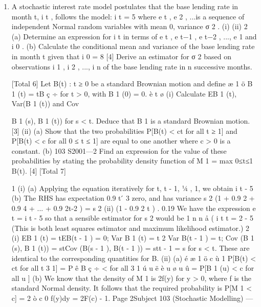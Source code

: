 \documentclass[a4paper,12pt]{article}
\begin{document}
\begin{enumerate}
\item A stochastic interest rate model postulates that the base lending rate in month t,
i t , follows the model:
i t = 5%
where e t , e 2 , ...is a sequence of independent Normal random variables with mean
0, variance σ 2 .
(i)
(ii)
2
(a) Determine an expression for i t in terms of e t , e t−1 , e t−2 , ..., e 1 and i 0 .
(b) Calculate the conditional mean and variance of the base lending
rate in month t given that i 0 = 8%
[4]
Derive an estimator for σ 2 based on observations i 1 , i 2 , ..., i n of the base
lending rate in n successive months.

[Total 6]
Let {B(t) : t ≥ 0} be a standard Brownian motion and define
æ 1 ö
B 1 (t) = tB ç ÷ for t > 0, with B 1 (0) = 0.
è t ø
(i) Calculate EB 1 (t), Var(B 1 (t)) and Cov{B 1 (s), B 1 (t)) for s < t. Deduce that B 1
is a standard Brownian motion.
[3]
(ii) (a)
Show that the two probabilities
P[B(t) < ct for all t ≥ 1]
and
P[B(t) < c for all 0 ≤ t ≤ 1]
are equal to one another where c > 0 is a constant.
(b)
103 S2001—2
Find an expression for the value of these probabilities by stating
the probability density function of M 1 = max 0≤t≤1 B(t).
[4]
[Total 7]

1
(i)
(a) Applying the equation iteratively for t, t - 1, 1⁄4 , 1, we obtain
i t - 5%
(b) The RHS has expectation 0.9 t  ́ 3%
zero, and has variance s 2 (1 + 0.9 2 + 0.9 4 + ... + 0.9 2t-2 ) = s 2
(ii)
(1 - 0.9 2 t )
.
0.19
We have the expression
e t = i t - 5%
so that a sensible estimator for s 2 would be
1
n
n
å ( i
t
t = 2
- 5%
(This is both least squares estimator and maximum likelihood estimator.)
2
(i)
EB 1 (t) = tEB(t - 1 ) = 0;
Var B 1 (t) = t 2 Var B(t - 1 ) = t;
Cov (B 1 (s), B 1 (t)) = stCov (B(s - 1 ), B(t - 1 )) = stt - 1 = s for s < t.
These are identical to the corresponding quantities for B.
(ii)
(a)
é æ 1 ö c
ù
1
P[B(t) < ct for all t 3 1] = P ê B ç ÷ < for all 3 1 ú
u
ë è u ø u
û
= P[B 1 (u) < c for all u ]
(b)
We know that the density of M 1 is 2f(y) for y > 0, where f is the
standard Normal density.
It follows that the required probability is
P[M 1 < c] = 2 ò c 0 f(y)dy = 2F(c) - 1.
Page 2Subject 103 (Stochastic Modelling) — 

}
\end{enumerate}
\end{document}
